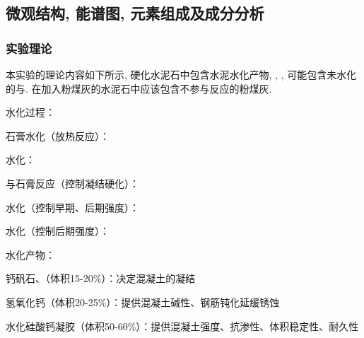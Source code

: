 \subsection{微观结构, 能谱图, 元素组成及成分分析}

\subsubsection{实验理论}
本实验的理论内容如下所示, 硬化水泥石中包含水泥水化产物, , , 可能包含未水化的与. 在加入粉煤灰的水泥石中应该包含不参与反应的粉煤灰.

\begin{center}
  水化过程：

  石膏水化（放热反应）：

  水化：

  \vspace{+1.em}
  与石膏反应（控制凝结硬化）：


  \vspace{+1.em}
  水化（控制早期、后期强度）：


  \vspace{+1.em}
  水化（控制后期强度）：


  \vspace{+1.em}
  水化产物：

  钙矾石、（体积15-20\%）：决定混凝土的凝结

  氢氧化钙（体积20-25\%）：提供混凝土碱性、钢筋钝化延缓锈蚀

  水化硅酸钙凝胶（体积50-60\%）：提供混凝土强度、抗渗性、体积稳定性、耐久性

\end{center}

